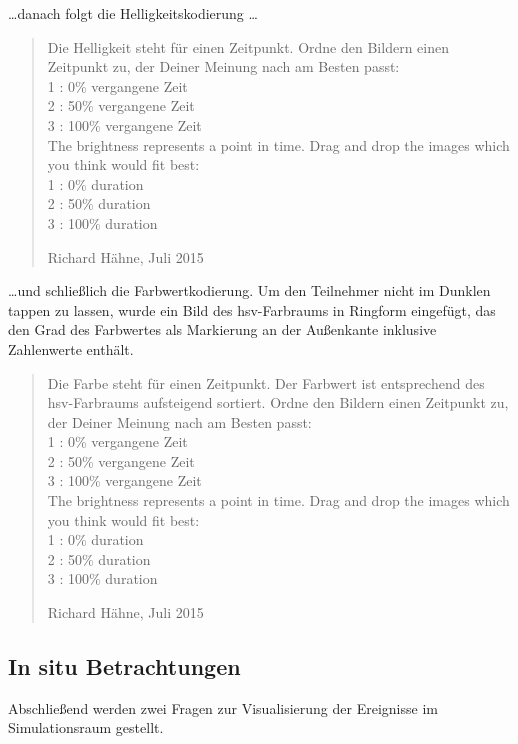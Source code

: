 \ldots danach folgt die Helligkeitskodierung \ldots
\blockquote[Richard Hähne, Juli 2015]{
Die Helligkeit steht für einen Zeitpunkt. Ordne den Bildern einen Zeitpunkt zu, der Deiner Meinung nach am Besten passt:\\
1 : 0\% vergangene Zeit\\
2 : 50\% vergangene Zeit\\
3 : 100\% vergangene Zeit\\

The brightness represents a point in time. Drag and drop the images which you think would fit best:\\
1 : 0\% duration\\
2 : 50\% duration\\
3 : 100\% duration
}

\ldots und schließlich die Farbwertkodierung. Um den Teilnehmer nicht im Dunklen tappen zu lassen, wurde ein Bild des \gls{hsv}-Farbraums in Ringform eingefügt, das den Grad des Farbwertes als Markierung an der Außenkante inklusive Zahlenwerte enthält.

\blockquote[Richard Hähne, Juli 2015]{
	Die Farbe steht für einen Zeitpunkt. Der Farbwert ist entsprechend des \gls{hsv}-Farbraums aufsteigend sortiert. Ordne den Bildern einen Zeitpunkt zu, der Deiner Meinung nach am Besten passt:\\
	1 : 0\% vergangene Zeit\\
	2 : 50\% vergangene Zeit\\
	3 : 100\% vergangene Zeit\\
	
	The brightness represents a point in time. Drag and drop the images which you think would fit best:\\
	1 : 0\% duration\\
	2 : 50\% duration\\
	3 : 100\% duration
}

\subsection*{In situ Betrachtungen}
Abschließend werden zwei Fragen zur Visualisierung der Ereignisse im Simulationsraum gestellt.

